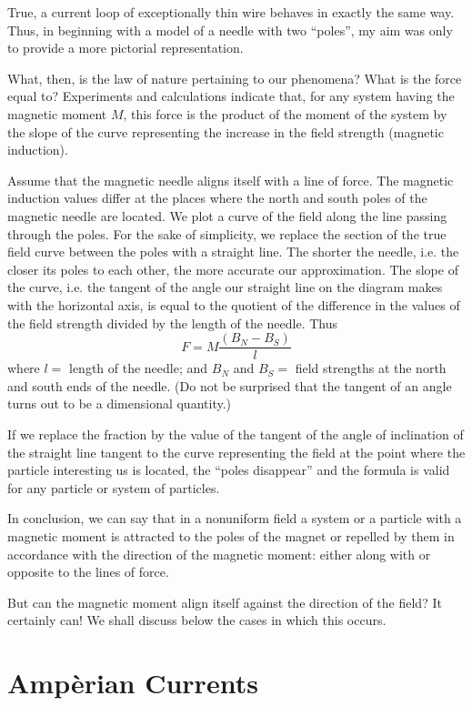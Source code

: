 True, a current loop of exceptionally thin wire behaves in exactly the same way. Thus, in beginning with a model of a needle with two ``poles'', my aim was only to provide a more pictorial representation.

What, then, is the law of nature pertaining to our phenomena? What is the force equal to? Experiments and calculations indicate that, for any system having the magnetic moment $M$, this force is the product of the moment of the system by the slope of the curve representing the increase in the field strength (magnetic induction).

Assume that the magnetic needle aligns itself with a line of force. The magnetic induction values differ at the places where the north and south poles of the magnetic needle are located. We plot a curve of the field along the line passing through the poles. For the sake of simplicity, we replace the section of the true field curve between the poles with a straight line. The shorter the needle, i.e. the closer its poles to each other, the more accurate our approximation. The slope of the curve, i.e. the tangent of the angle our straight line on the diagram makes with the horizontal axis, is equal to the quotient of the difference in the values of the field strength divided by the length of the needle. Thus
\begin{equation*}%
F = M \frac{(B_{N}-B_{S})}{l}
\label{force-mag}
\end{equation*}
where $l =$ length of the needle; and $B_{N}$ and $B_{S}=$  field strengths at the north and south ends of the needle. (Do not be surprised that the tangent of an angle turns out to be a dimensional quantity.)

If we replace the fraction by the value of the tangent of the angle of inclination of the straight line tangent to the curve representing the field at the point where the particle interesting us is located, the ``poles disappear'' and the formula is valid for any particle or system of particles.

In conclusion, we can say that in a nonuniform field a system or a particle with a magnetic moment is attracted to the poles of the magnet or repelled by them in accordance with the direction of the magnetic moment: either along with or opposite to the lines of force.

But can the magnetic moment align itself against the direction of the field? It certainly can! We shall discuss below the cases in which this occurs.

\section{Amp\`erian Currents}

